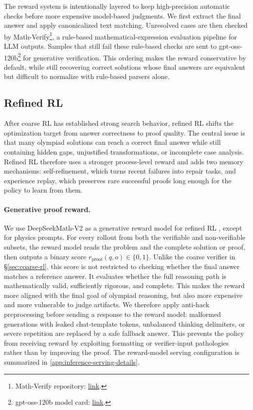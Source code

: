 The reward system is intentionally layered to keep high-precision automatic
checks before more expensive model-based judgments. We first extract the final
answer and apply canonicalized text matching. Unresolved cases are then checked by Math-Verify\footnote{Math-Verify
repository: \href{https://github.com/huggingface/Math-Verify}{link}.}, a
rule-based mathematical-expression evaluation pipeline for LLM outputs. Samples
that still fail these rule-based checks are sent to
gpt-oss-120b\footnote{gpt-oss-120b model card:
\href{https://huggingface.co/openai/gpt-oss-120b}{link}.} \citep{openai2025gptoss}
for generative verification. This ordering makes the reward conservative by
default, while still recovering correct solutions whose final answers are
equivalent but difficult to normalize with rule-based parsers alone.

\subsection{Refined RL}

After coarse RL has established strong search behavior, refined RL shifts the
optimization target from answer correctness to proof quality. The central issue
is that many olympiad solutions can reach a correct final answer while still
containing hidden gaps, unjustified transformations, or incomplete case
analysis. Refined RL therefore uses a stronger process-level reward and adds two
memory mechanisms: self-refinement, which turns recent failures into repair
tasks, and experience replay, which preserves rare successful proofs long
enough for the policy to learn from them.

\paragraph{Generative proof reward.}
We use DeepSeekMath-V2 as a generative reward model for refined RL
\citep{deepseekmathv2}, except for physics prompts. 
For every rollout from both the verifiable and
non-verifiable subsets, the reward model reads the problem and the complete
solution or proof, then outputs a binary score $r_{\mathrm{proof}}(q,o)\in
\{0,1\}$. 
Unlike the coarse verifier in \S\ref{sec:coarse-rl}, this score is not restricted to
checking whether the final answer matches a reference answer. 
It evaluates
whether the full reasoning path is mathematically valid, sufficiently rigorous,
and complete. This makes the reward more aligned with the final goal of
olympiad reasoning, but also more expensive and more vulnerable to judge
artifacts. We therefore apply anti-hack preprocessing before sending a response
to the reward model: malformed generations with leaked chat-template tokens,
unbalanced thinking delimiters, or severe repetition are replaced by a safe
fallback answer. This prevents the policy from receiving reward by exploiting
formatting or verifier-input pathologies rather than by improving the proof. The
reward-model serving configuration is summarized in
\cref{app:inference-serving-details}.

